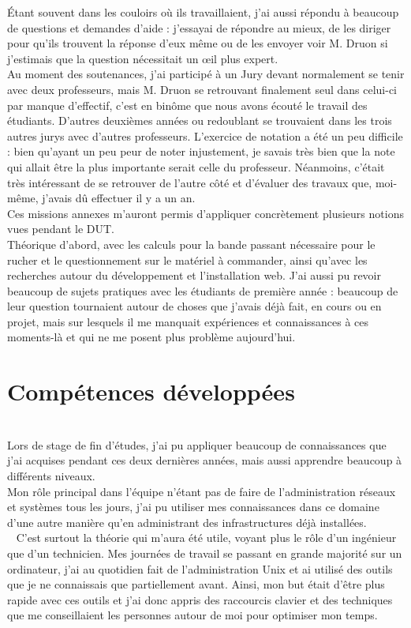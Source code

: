 \documentclass[11pt,french,a4paper]{report}
\begin{document}
Étant souvent dans les couloirs où ils travaillaient, j'ai aussi répondu à beaucoup de questions et demandes d'aide : 
j'essayai de répondre au mieux, de les diriger pour qu'ils trouvent la réponse d'eux même ou de les envoyer voir M. Druon si 
j'estimais que la question nécessitait un œil plus expert. \\
Au moment des soutenances, j'ai participé à un Jury devant normalement se tenir avec deux professeurs, mais M. Druon se retrouvant 
finalement seul dans celui-ci par manque d'effectif, c'est en binôme que nous avons écouté le travail des étudiants.
D'autres deuxièmes années ou redoublant se trouvaient dans les trois autres jurys avec d'autres professeurs. 
L'exercice de notation a été un peu difficile : bien qu'ayant un peu peur de noter injustement,
je savais très bien que la note qui allait être la plus importante serait celle 
du professeur. Néanmoins, c'était très intéressant de se retrouver de l'autre côté et d'évaluer des travaux que, moi-même, 
j'avais dû effectuer il y a un an. \\

Ces missions annexes m'auront permis d'appliquer concrètement plusieurs notions vues pendant le DUT. \\
Théorique d'abord, avec les calculs pour la bande passant nécessaire pour le rucher et le questionnement sur le matériel à commander, ainsi
qu'avec les recherches autour du développement et l'installation web. 
J'ai aussi pu revoir beaucoup de sujets pratiques avec les étudiants de première année : beaucoup de leur question tournaient autour 
de choses que j'avais déjà fait, en cours ou en projet,  mais sur lesquels il me manquait expériences et connaissances à ces moments-là et
qui ne me posent plus problème aujourd'hui. \\

    \section{Compétences développées} \\
Lors de stage de fin d'études, j'ai pu appliquer beaucoup de connaissances que j'ai acquises pendant ces deux dernières années,
mais aussi apprendre beaucoup à différents niveaux.\\
Mon rôle principal dans l'équipe n'étant pas de faire de l'administration réseaux et systèmes tous les jours, 
j'ai pu utiliser mes connaissances dans ce domaine d'une autre manière qu'en administrant des infrastructures déjà installées. \\ 
C'est surtout la théorie qui m'aura été utile, voyant plus le rôle d'un ingénieur que d'un technicien. 
Mes journées de travail se passant en grande majorité sur un ordinateur, j'ai au quotidien fait de l'administration Unix et ai
utilisé des outils que je ne connaissais que partiellement avant. Ainsi, mon but était d'être plus rapide avec ces outils 
et j'ai donc appris des raccourcis clavier et des techniques que me conseillaient les personnes autour de moi pour optimiser 
mon temps. \\
\end{document}
